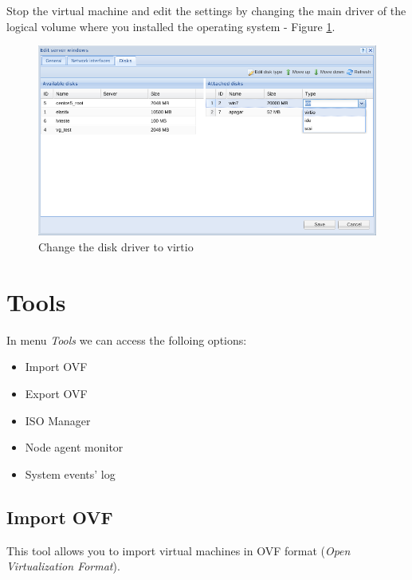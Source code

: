 Stop the virtual machine and edit the settings by changing the main driver of the logical volume where you installed the operating system - Figure \ref{fig:virtio16}.

\begin{figure}[H]
	\begin{center}
	\includegraphics[scale=0.5]{screenshots/virtio/virtio_16.png}
	\caption{Change the disk driver to virtio}
	\label{fig:virtio16}
	\end{center}
\end{figure}

\section{Tools}

In menu \emph{Tools} we can access the folloing options:
\begin{itemize}
\item Import OVF
\item Export OVF
\item ISO Manager
\item Node agent monitor
\item System events' log
\end{itemize}

\subsection{Import OVF}
This tool allows you to import virtual machines in OVF format (\emph{Open Virtualization Format}).

